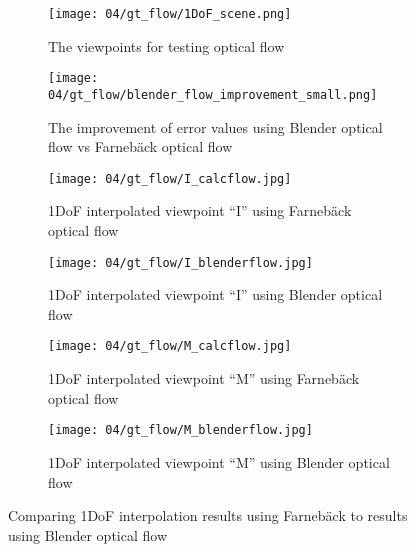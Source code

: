 \begin{figure}
\centering
    \hfill
    \begin{subfigure}[b]{0.4\textwidth}
            \centering
            \texttt{[image: 04/gt\_flow/1DoF\_scene.png]}
            \caption{The viewpoints for testing optical flow}
    \end{subfigure}
    \hfill
    \begin{subfigure}[b]{0.4\textwidth}
            \centering
            \texttt{[image: 04/gt\_flow/blender\_flow\_improvement\_small.png]}
            \caption{The improvement of error values using Blender optical flow vs Farneb\"ack optical flow}
    \end{subfigure}
    \hfill
    \hfill
\par\bigskip
    \hfill
    \begin{subfigure}[b]{0.4\textwidth}
            \centering
            \texttt{[image: 04/gt\_flow/I\_calcflow.jpg]}
            \caption{1DoF interpolated viewpoint ``I'' using Farneb\"ack optical flow}
    \end{subfigure}
    \hfill
    \begin{subfigure}[b]{0.4\textwidth}
            \centering
            \texttt{[image: 04/gt\_flow/I\_blenderflow.jpg]}
            \caption{1DoF interpolated viewpoint ``I'' using Blender optical flow}
    \end{subfigure}
    \hfill
    \hfill
\par\bigskip
    \hfill
    \begin{subfigure}[b]{0.4\textwidth}
            \centering
            \texttt{[image: 04/gt\_flow/M\_calcflow.jpg]}
            \caption{1DoF interpolated viewpoint ``M'' using Farneb\"ack optical flow}
    \end{subfigure}
    \hfill
    \begin{subfigure}[b]{0.4\textwidth}
            \centering
            \texttt{[image: 04/gt\_flow/M\_blenderflow.jpg]}
            \caption{1DoF interpolated viewpoint ``M'' using Blender optical flow}
    \end{subfigure}
    \hfill
    \hfill
  \caption{Comparing 1DoF interpolation results using Farneb\"ack to results using Blender optical flow} \label{fig:of_comparison}
\end{figure}



